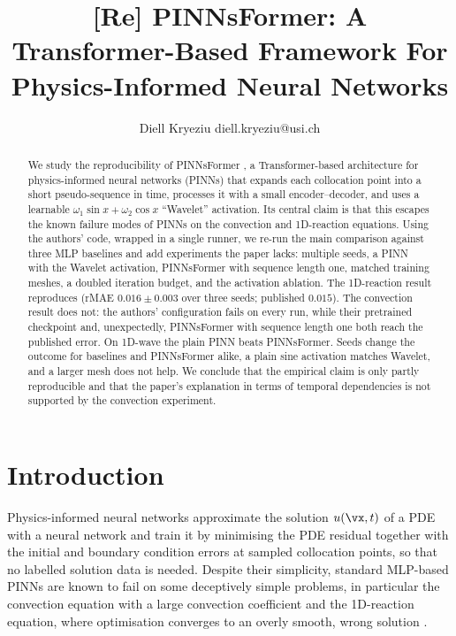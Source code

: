 \documentclass[10pt]{article} %
\title{[Re] PINNsFormer: A Transformer-Based Framework For Physics-Informed Neural Networks}
\author{%
  \name Diell Kryeziu \email diell.kryeziu@usi.ch
}
\begin{document}
\maketitle

\begin{abstract}
We study the reproducibility of PINNsFormer \citep{zhao2024pinnsformer}, a Transformer-based architecture for physics-informed neural networks (PINNs) that expands each collocation point into a short pseudo-sequence in time, processes it with a small encoder--decoder, and uses a learnable $\omega_1\sin x+\omega_2\cos x$ ``Wavelet'' activation. Its central claim is that this escapes the known failure modes of PINNs on the convection and 1D-reaction equations. Using the authors' code, wrapped in a single runner, we re-run the main comparison against three MLP baselines and add experiments the paper lacks: multiple seeds, a PINN with the Wavelet activation, PINNsFormer with sequence length one, matched training meshes, a doubled iteration budget, and the activation ablation. The 1D-reaction result reproduces (rMAE $0.016\pm0.003$ over three seeds; published $0.015$). The convection result does not: the authors' configuration fails on every run, while their pretrained checkpoint and, unexpectedly, PINNsFormer with sequence length one both reach the published error. On 1D-wave the plain PINN beats PINNsFormer. Seeds change the outcome for baselines and PINNsFormer alike, a plain sine activation matches Wavelet, and a larger mesh does not help. We conclude that the empirical claim is only partly reproducible and that the paper's explanation in terms of temporal dependencies is not supported by the convection experiment.
\end{abstract}


\section{Introduction}
Physics-informed neural networks \citep{raissi2019pinns} approximate the solution $u(\vx,t)$ of a PDE with a neural network and train it by minimising the PDE residual together with the initial and boundary condition errors at sampled collocation points, so that no labelled solution data is needed. Despite their simplicity, standard MLP-based PINNs are known to fail on some deceptively simple problems, in particular the convection equation with a large convection coefficient and the 1D-reaction equation, where optimisation converges to an overly smooth, wrong solution \citep{krishnapriyan2021failure}.
\end{document}

